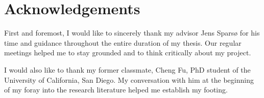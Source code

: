 \chapter{Acknowledgements}

First and foremost, I would like to sincerely thank my advisor Jens Sparsø for his time and guidance throughout the entire duration of my thesis. Our regular meetings helped me to stay grounded and to think critically about my project.

I would also like to thank my former classmate, Cheng Fu, PhD student of the University of California, San Diego. My conversation with him at the beginning of my foray into the research literature helped me establish my footing.